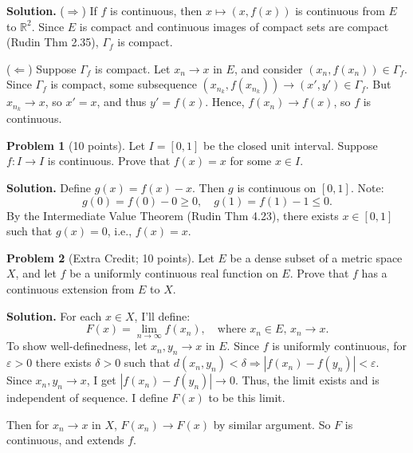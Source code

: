\documentclass[12pt,oneside]{article}
\theoremstyle{definition}
\newtheorem{problem}{Problem}
\begin{document}
\textbf{Solution.} ($\Rightarrow$) If $f$ is continuous, then $x \mapsto (x, f(x))$ is continuous from $E$ to $\mathbb{R}^2$. Since $E$ is compact and continuous images of compact sets are compact (Rudin Thm 2.35), $\Gamma_f$ is compact.

($\Leftarrow$) Suppose $\Gamma_f$ is compact. Let $x_n \to x$ in $E$, and consider $(x_n, f(x_n)) \in \Gamma_f$. Since $\Gamma_f$ is compact, some subsequence $(x_{n_k}, f(x_{n_k})) \to (x', y') \in \Gamma_f$. But $x_{n_k} \to x$, so $x' = x$, and thus $y' = f(x)$. Hence, $f(x_n) \to f(x)$, so $f$ is continuous.

\bigskip

\begin{problem}[10 points]
Let $I = [0,1]$ be the closed unit interval. Suppose $f : I \rightarrow I$ is continuous. Prove that $f(x) = x$ for some $x \in I$. 
\end{problem}

\textbf{Solution.} Define $g(x) = f(x) - x$. Then $g$ is continuous on $[0,1]$. Note:
\[
g(0) = f(0) - 0 \geq 0, \quad g(1) = f(1) - 1 \leq 0.
\]
By the Intermediate Value Theorem (Rudin Thm 4.23), there exists $x \in [0,1]$ such that $g(x) = 0$, i.e., $f(x) = x$.

\bigskip

\begin{problem}[Extra Credit; 10 points]
Let $E$ be a dense subset of a metric space $X$, and let $f$ be a uniformly continuous real function on $E$. Prove that $f$ has a continuous extension from $E$ to $X$. 
\end{problem}

\textbf{Solution.} For each $x \in X$, I'll define:
\[
F(x) = \lim_{n \to \infty} f(x_n), \quad \text{where } x_n \in E, \, x_n \to x.
\]
To show well-definedness, let $x_n, y_n \to x$ in $E$. Since $f$ is uniformly continuous, for $\varepsilon > 0$ there exists $\delta > 0$ such that $d(x_n, y_n) < \delta \Rightarrow |f(x_n) - f(y_n)| < \varepsilon$. Since $x_n, y_n \to x$, I get $|f(x_n) - f(y_n)| \to 0$. Thus, the limit exists and is independent of sequence. I define $F(x)$ to be this limit.

Then for $x_n \to x$ in $X$, $F(x_n) \to F(x)$ by similar argument. So $F$ is continuous, and extends $f$.
\end{document}

